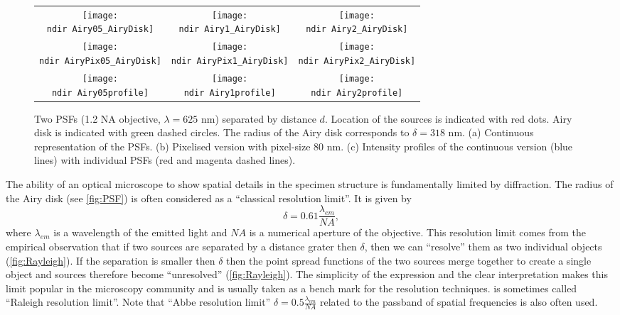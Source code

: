 \begin{figure}[!bht]
	\centering
	\newcommand{\wf}{.3\textwidth}	
	\newcommand{\ndir}{figures/psfillustration/}
	\begin{tabular}{ccc}
		\subfloat[$d=\delta/2$]{\texttt{[image: \\ndir Airy05\_AiryDisk]}}
		& \subfloat[$d=\delta$]{\texttt{[image: \\ndir Airy1\_AiryDisk]}}
		& \subfloat[$d=2\delta$]{\texttt{[image: \\ndir Airy2\_AiryDisk]}}
		\tabularnewline
		\subfloat[$d=\delta/2$]{\texttt{[image: \\ndir AiryPix05\_AiryDisk]}}
		& \subfloat[$d=\delta$]{\texttt{[image: \\ndir AiryPix1\_AiryDisk]}}
		& \subfloat[$d=2\delta$]{\texttt{[image: \\ndir AiryPix2\_AiryDisk]}}
		\tabularnewline
		\subfloat[$d=\delta/2$]{\texttt{[image: \\ndir Airy05profile]}}
		& \subfloat[$d=\delta$]{\texttt{[image: \\ndir Airy1profile]}}
		& \subfloat[$d=2\delta$]{\texttt{[image: \\ndir Airy2profile]}}
		\tabularnewline
	\end{tabular}
	\caption{Two PSFs (1.2 NA objective, $\lambda=625$ nm) separated by distance $d$. Location of the sources is indicated with red dots. Airy disk is indicated with green dashed circles. The radius of the Airy disk corresponds to $\delta=318$ nm. (a) Continuous representation of the PSFs. (b) Pixelised version with pixel-size 80 nm. (c) Intensity profiles of the continuous version (blue lines) with individual PSFs (red and magenta dashed lines).}
	\label{fig:Rayleigh}
\end{figure}
%
The ability of an optical microscope to show spatial details in the specimen structure is fundamentally limited by diffraction. The radius of the Airy disk (see \autoref{fig:PSF}) is often considered as a ``classical resolution limit''. It is given by
%
\begin{equation}
 	\delta=0.61\frac{\lambda_{em}}{NA}, 
	\label{eq:Airy}
\end{equation}
%
where $\lambda_{em}$ is a wavelength of the emitted light and $NA$ is a numerical aperture of the objective. This resolution limit comes from the empirical observation that if two sources are separated by a distance grater then $\delta$, then we can ``resolve'' them as two individual objects (\autoref{fig:Rayleigh}\ccc). If the separation is smaller then $\delta$ then the point spread functions of the two sources merge together to create a single object and sources therefore become ``unresolved'' (\autoref{fig:Rayleigh}\aaa). The simplicity of the expression and the clear interpretation makes this limit popular in the microscopy community and is usually taken as a bench mark for the resolution techniques.  is sometimes called ``Raleigh resolution limit''. Note that ``Abbe resolution limit'' $\delta=0.5\frac{\lambda_{em}}{NA}$ related to the passband of spatial frequencies is also often used.

